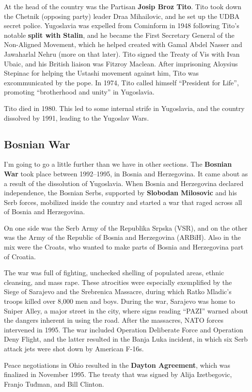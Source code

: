 At the head of the country was the Partisan \textbf{Josip Broz Tito}.
Tito took down the Chetnik (opposing party) leader Draa Mihailovic, and he set up the UDBA secret police.
Yugoslavia was expelled from Cominform in 1948 following Tito's notable \textbf{split with Stalin},
and he became the First Secretary General of the Non-Aligned Movement,
which he helped created with Gamal Abdel Nasser and Jawaharlal Nehru (more on that later).
Tito signed the Treaty of Vis with Ivan Ubaic, and his British liaison was Fitzroy Maclean.
After imprisoning Aloysius Stepinac for helping the Ustashi movement against him,
Tito was excommunicated by the pope.
In 1974, Tito called himself ``President for Life'', promoting ``brotherhood and unity'' in Yugoslavia.

Tito died in 1980.
This led to some internal strife in Yugoslavia, and the country dissolved by 1991, leading to the Yugoslav Wars.

\subsection*{Bosnian War}

I'm going to go a little further than we have in other sections.
The \textbf{Bosnian War} took place between 1992--1995, in Bosnia and Herzegovina.
It came about as a result of the dissolution of Yugoslavia.
When Bosnia and Herzegovina declared independence,
the Bosnian Serbs, supported by \textbf{Slobodan Milosovic} and his Serb forces,
mobilized inside the country and started a war that raged across all of Bosnia and Herzegovina.

On one side was the Serb Army of the Republika Srpska (VSR),
and on the other was the Army of the Republic of Bosnia and Herzegovina (ARBiH).
Also in the mix were the Croats, who wanted to make parts of Bosnia and Herzegovina part of Croatia.

The war was full of fighting, unchecked shelling of populated areas, ethnic cleansing, and mass rape.
These atrocities were especially exemplified by the Siege of Sarajevo
and the Srebrenica Massacre, during which Ratko Mladic's troops killed over 8,000 men and boys.
During the war, Sarajevo was home to Sniper Alley, a major street in the city,
where signs reading ``PAZI'' warned about the dangers inherent in using the road.
After the massacres, NATO forces intervened in 1995.
The war included Operation Deliberate Force and Operation Deny Flight,
and the latter resulted in the Banja Luka incident,
in which six Serb attack jets were shot down by American F-16s.

Peace negotiations in Ohio resulted in the \textbf{Dayton Agreement}, which was finalized in November 1995.
The treaty that was signed by Alija Izetbegovic, Franjo Tuđman, and Bill Clinton.
